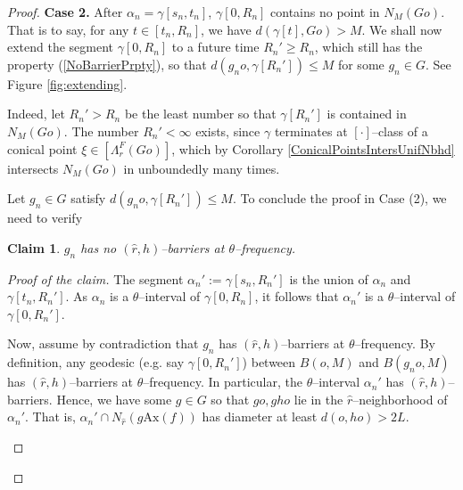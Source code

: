 \documentclass{amsart}
\newtheorem*{claim}{Claim}
\theoremstyle{definition}
\theoremstyle{remark}
\newcommand{\ax}{\mathrm{Ax}}
\begin{document}
\begin{proof}
\textbf{Case 2.}   After $\alpha_n=\gamma[s_n,t_n]$,  $\gamma[0,R_n]$ contains no point in $N_M(Go)$. That is to say, for any $t\in [t_n, R_n]$, we have $d(\gamma[t], Go)>M$. We shall now extend    the segment $\gamma[0,R_n]$ to a future time $R_n'\ge R_n$, which  still has the    property (\ref{NoBarrierPrpty}), so that $d(g_no, \gamma[R_n'])\le M$ for some $g_n\in G$.  See Figure \ref{fig:extending}.

Indeed,   let $R_n'>R_n$ be the least number so that $\gamma[R_n']$ is contained in $N_M(Go)$. The number $R_n'<\infty$ exists, since  $\gamma$ terminates at $[\cdot]$--class of a conical point $\xi\in [\Lambda_r^F(Go)]$, which by Corollary \ref{ConicalPointsIntersUnifNbhd}  intersects  $N_{M}(Go)$ in  unboundedly many times.  %

Let  $g_n\in G$ satisfy  $d(g_no, \gamma[R_n'])\le M$.  To conclude the proof in Case (2), we need to verify 
\begin{claim}
$g_n$ has no $(\hat r,h)$--barriers at $\theta$--frequency.    
\end{claim}  
\begin{proof}[Proof of the claim]
The segment $\alpha_n':=\gamma[s_n, R_n']$  is the union of $\alpha_n$ and $\gamma[t_n, R_n']$. As $\alpha_n$ is a $\theta$--interval  of $\gamma[0,R_n]$, it  follows that $\alpha_n'$ is a $\theta$--interval  of $\gamma[0,R_n']$. 

Now,  assume by contradiction that $g_n$ has  $(\hat r,h)$--barriers at $\theta$--frequency. By definition, any geodesic (e.g. say $\gamma[0, R_n']$)  between $B(o,M)$ and $B(g_no, M)$ has $(\hat r,h)$--barriers at $\theta$--frequency. In particular, the $\theta$--interval $\alpha_n'$ has $(\hat r,h)$--barriers. Hence, we have some $g\in G$ so that $go, gho$ lie in the $\hat r$--neighborhood of $\alpha_n'$. That is, $\alpha_n'\cap N_{\hat r}(g\ax(f))$ has diameter at least $d(o,ho)>2L$.
\begin{figure}[h]
    \centering



\begin{tikzpicture}[x=0.75pt,y=0.75pt,yscale=-1,xscale=1]


\end{tikzpicture}
\end{figure}
\end{proof}
\end{proof}
\end{document}
